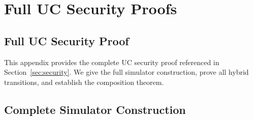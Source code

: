 \documentclass[letterpaper,twocolumn,10pt]{article}
\theoremstyle{definition}
\begin{document}
\section{Full UC Security Proofs}
\label{sec:full-proofs}

\subsection{Full UC Security Proof}
\label{sec:full-proof}

This appendix provides the complete UC security proof referenced in
Section~\ref{sec:security}. We give the full simulator construction, prove
all hybrid transitions, and establish the composition theorem.

\subsection{Complete Simulator Construction}
\end{document}

